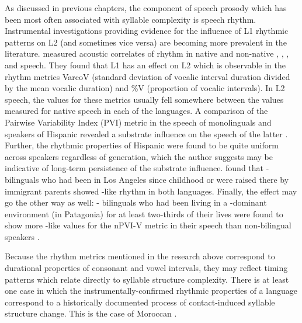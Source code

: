   As discussed in previous chapters, the component of speech prosody which has been most often associated with syllable complexity is speech rhythm. Instrumental investigations providing evidence for the influence of L1 rhythmic patterns on L2 (and sometimes vice versa) are becoming more prevalent in the literature. \citet{WhiteMattys2007} measured acoustic correlates of rhythm in native and non-native , , , and  speech. They found that L1 has an effect on L2 which is observable in the rhythm metrics VarcoV (standard deviation of vocalic interval duration divided by the mean vocalic duration) and \%V (proportion of vocalic intervals). In L2 speech, the values for these metrics usually fell somewhere between the values measured for native speech in each of the languages. A comparison of the Pairwise Variability Index (PVI) metric in the speech of  monolinguals and speakers of Hispanic  revealed a  substrate influence on the speech of the latter \citep{Carter2005}. Further, the rhythmic properties of Hispanic  were found to be quite uniform across speakers regardless of generation, which the author suggests may be indicative of long-term persistence of  the substrate influence. \citet{Robles-Puente2014} found that - bilinguals who had been in Los Angeles since childhood or were raised there by immigrant parents showed -like rhythm in both languages. Finally, the effect may go the other way as well: - bilinguals who had been living in a -dominant environment (in Patagonia) for at least two-thirds of their lives were found to show more -like values for the nPVI-V metric in their  speech than non-bilingual  speakers \citep{CoetzeeEtAl2015}. 

  Because the rhythm metrics mentioned in the research above correspond to durational properties of consonant and vowel intervals, they may reflect timing patterns which relate directly to syllable structure complexity. There is at least one case in which the instrumentally-confirmed rhythmic properties of a language correspond to a historically documented process of contact-induced syllable structure change. This is the case of Moroccan .


